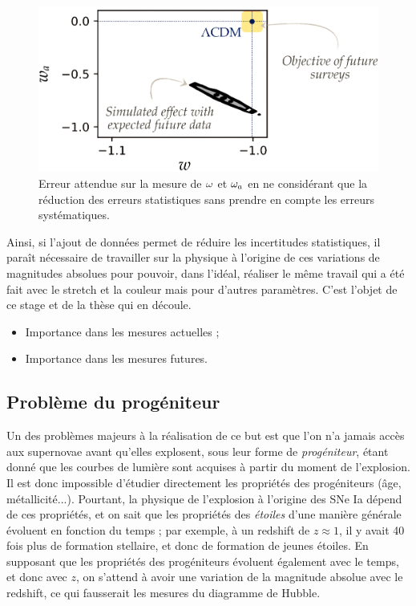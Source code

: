 \documentclass[a4paper, 12pt, svgnames]{article}
\begin{document}
\begin{figure}[htbp!]
    \centering
    \includegraphics[width=.5\linewidth]{Rapport_figures/error.PNG}
    \captionsetup{justification=centering}
    \caption{Erreur attendue sur la mesure de $\omega$ et $\omega_a$ en ne considérant
    que la réduction des erreurs statistiques sans prendre en compte les erreurs
    systématiques.}
    \label{err_syst}
\end{figure}

Ainsi, si l'ajout de données permet de réduire
les incertitudes statistiques, il paraît nécessaire de travailler sur la
physique à l'origine de ces variations de magnitudes absolues pour pouvoir, dans
l'idéal, réaliser le même travail qui a été fait avec le stretch et la couleur
mais pour d'autres paramètres. C'est l'objet de ce stage et de la thèse qui en
découle.

\begin{itemize}
    \item Importance dans les mesures actuelles ;
    \item Importance dans les mesures futures.
\end{itemize}

\subsection{Problème du progéniteur}\label{ssec:prog}
Un des problèmes majeurs à la réalisation de ce but est que l'on n'a jamais
accès aux supernovae avant qu'elles explosent, sous leur forme de
\textit{progéniteur}, étant donné que les courbes de lumière sont acquises à
partir du moment de l'explosion. Il est donc impossible d'étudier directement
les propriétés des progéniteurs (âge, métallicité...). Pourtant, la physique de
l'explosion à l'origine des SNe Ia dépend de ces propriétés, et on sait que les
propriétés des \textit{étoiles} d'une manière générale évoluent en fonction du
temps ; par exemple, à un redshift de $z \approx 1$, il y avait 40 fois plus de
formation stellaire, et donc de formation de jeunes étoiles. En supposant que
les propriétés des progéniteurs évoluent également avec le temps, et donc avec
$z$, on s'attend à avoir une variation de la magnitude absolue avec le redshift,
ce qui fausserait les mesures du diagramme de Hubble.
\end{document}
